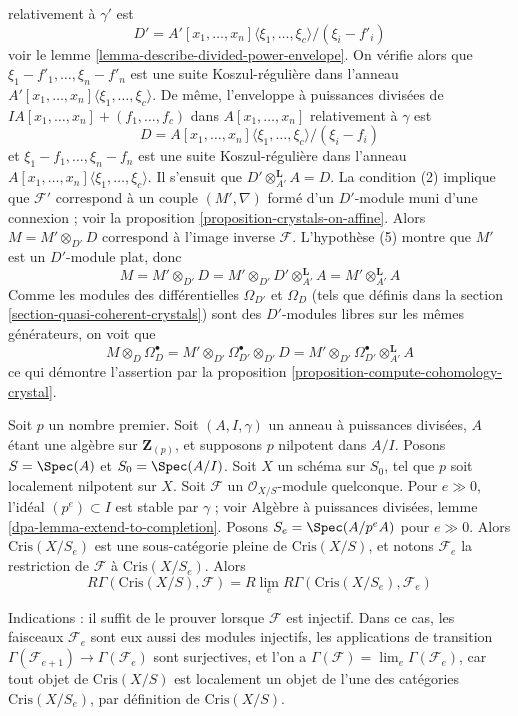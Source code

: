 \begin{remark}
relativement à $\gamma'$ est
$$
D' = A'[x_1, \ldots, x_n]\langle \xi_1, \ldots, \xi_c \rangle/(\xi_i - f'_i)
$$
voir le lemme \ref{lemma-describe-divided-power-envelope}. On vérifie alors que
$\xi_1 - f'_1, \ldots, \xi_n - f'_n$ est une suite Koszul-régulière dans
l'anneau $A'[x_1, \ldots, x_n]\langle \xi_1, \ldots, \xi_c\rangle$.
De même, l'enveloppe à puissances divisées de
$IA[x_1, \ldots, x_n] + (f_1, \ldots, f_c)$ dans $A[x_1, \ldots, x_n]$
relativement à $\gamma$ est
$$
D = A[x_1, \ldots, x_n]\langle \xi_1, \ldots, \xi_c\rangle/(\xi_i - f_i)
$$
et $\xi_1 - f_1, \ldots, \xi_n - f_n$ est une suite Koszul-régulière dans
l'anneau $A[x_1, \ldots, x_n]\langle \xi_1, \ldots, \xi_c\rangle$.
Il s'ensuit que $D' \otimes_{A'}^\mathbf{L} A = D$. La condition (2)
implique que $\mathcal{F}'$ correspond à un couple $(M', \nabla)$
formé d'un $D'$-module muni d'une connexion ; voir la
proposition \ref{proposition-crystals-on-affine}.
Alors $M = M' \otimes_{D'} D$ correspond à l'image inverse $\mathcal{F}$.
L'hypothèse (5) montre que $M'$ est un $D'$-module plat, donc
$$
M = M' \otimes_{D'} D = M' \otimes_{D'} D' \otimes_{A'}^\mathbf{L} A
= M' \otimes_{A'}^\mathbf{L} A
$$
Comme les modules des différentielles $\Omega_{D'}$ et $\Omega_D$
(tels que définis dans la section \ref{section-quasi-coherent-crystals})
sont des $D'$-modules libres sur les mêmes générateurs, on voit que
$$
M \otimes_D \Omega^\bullet_D =
M' \otimes_{D'} \Omega^\bullet_{D'} \otimes_{D'} D =
M' \otimes_{D'} \Omega^\bullet_{D'} \otimes_{A'}^\mathbf{L} A
$$
ce qui démontre l'assertion par la
proposition \ref{proposition-compute-cohomology-crystal}.
\end{remark}

\begin{remark}[Rlim]
\label{remark-rlim}
Soit $p$ un nombre premier. Soit $(A, I, \gamma)$ un anneau à puissances
divisées, $A$ étant une algèbre sur $\mathbf{Z}_{(p)}$, et supposons $p$ nilpotent
dans $A/I$. Posons $S = \Spec(A)$ et $S_0 = \Spec(A/I)$.
Soit $X$ un schéma sur $S_0$, tel que $p$ soit localement
nilpotent sur $X$. Soit $\mathcal{F}$ un
$\mathcal{O}_{X/S}$-module quelconque. Pour $e \gg 0$, l'idéal $(p^e) \subset I$
est stable par $\gamma$ ; voir
Algèbre à puissances divisées, lemme \ref{dpa-lemma-extend-to-completion}.
Posons $S_e = \Spec(A/p^eA)$ pour $e \gg 0$.
Alors $\text{Cris}(X/S_e)$ est une sous-catégorie pleine de $\text{Cris}(X/S)$,
et notons $\mathcal{F}_e$ la restriction de $\mathcal{F}$ à
$\text{Cris}(X/S_e)$. Alors
$$
R\Gamma(\text{Cris}(X/S), \mathcal{F}) =
R\lim_e R\Gamma(\text{Cris}(X/S_e), \mathcal{F}_e)
$$

\medskip\noindent
Indications : il suffit de le prouver lorsque $\mathcal{F}$ est injectif.
Dans ce cas, les faisceaux $\mathcal{F}_e$ sont eux aussi des
modules injectifs, les applications de transition
$\Gamma(\mathcal{F}_{e + 1}) \to \Gamma(\mathcal{F}_e)$ sont
surjectives, et l'on a
$\Gamma(\mathcal{F}) = \lim_e \Gamma(\mathcal{F}_e)$, car
tout objet de $\text{Cris}(X/S)$ est localement un objet de l'une
des catégories $\text{Cris}(X/S_e)$, par définition de
$\text{Cris}(X/S)$.
\end{remark}

